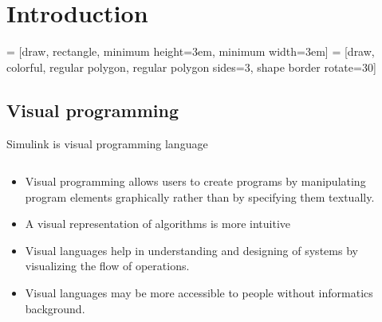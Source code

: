 \section{Introduction}

 = [draw, rectangle, minimum height=3em, minimum width=3em]
 = [draw, colorful, regular polygon, regular polygon sides=3, shape border rotate=30]

\subsection{Visual programming}
\begin{frame}{Simulink is visual programming language}
  \begin{columns}
  \begin{column}{0.5\textwidth}
  \small
    \begin{itemize}
    \item Visual programming allows users to create programs by manipulating program elements graphically rather than by specifying them textually.
    \item A visual representation of algorithms is more intuitive 
    \item Visual languages help in understanding and designing of systems by visualizing the flow of operations.
    \item Visual languages may be more accessible to people without informatics background. 
  \end{itemize}
  \end{column}
  \begin{column}{0.5\textwidth}

\end{column}
\end{columns}
\end{frame}
